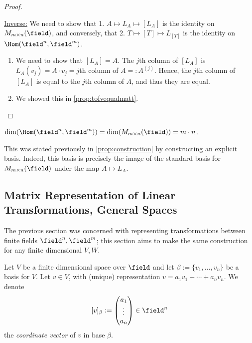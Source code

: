 \begin{proof}
\begin{enumerate}
    \end{enumerate}
    \underline{Inverse:} We need to show that 1. $A \mapsto L_A \mapsto [L_A]$ is the identity on $M_{m \times n}(\field)$, and conversely, that 2. $T \mapsto [T] \mapsto L_{[T]}$ is the identity on $\Hom(\field^n, \field^m)$.
    \begin{enumerate}
        \item We need to show that $[L_A] = A$. The $j$th column of $[L_A]$ is $L_A(v_j) = A \cdot v_j = j$th column of $A =: A^{(j)}$. Hence, the $j$th column of $[L_A]$ is equal to the $j$th column of $A$, and thus they are equal.
        \item We showed this in \cref{prop:tofvequalmatt}.
    \end{enumerate}
\end{proof}

\begin{corollary}
    $\dim(\Hom(\field^n, \field^m)) = \dim(M_{m\times n}(\field)) = m \cdot n$.
\end{corollary}
\begin{remark}
    This was stated previously in \cref{prop:construction} by constructing an explicit basis. Indeed, this basis is precisely the image of the standard basis for $M_{m \times n}(\field)$ under the map $A \mapsto L_A$.
\end{remark}

\subsection{Matrix Representation of Linear Transformations, General Spaces}

\begin{remark}
    The previous section was concerned with representing transformations between finite fields $\field^n, \field^m$; this section aims to make the same construction for any finite dimensional $V, W$.
\end{remark}

\begin{definition}
    Let $V$ be a finite dimensional space over $\field$ and let $\beta := \{v_1, \dots, v_n\}$ be a basis for $V$. Let $v \in V$, with (unique) representation $v = a_1 v_1 + \cdots + a_n v_n$. We denote \[
    [v]_\beta := \begin{pmatrix}
        a_1\\
        \vdots\\
        a_n
    \end{pmatrix}     \in \field^n
    \]
    the \emph{coordinate vector} of $v$ in base $\beta$.
\end{definition}

